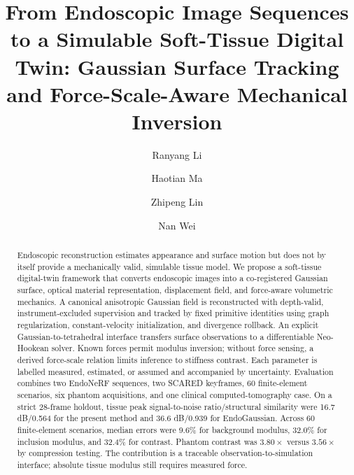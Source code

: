 \documentclass[smallextended]{svjour3}
\begin{document}
\title{From Endoscopic Image Sequences to a Simulable Soft-Tissue Digital Twin: Gaussian Surface Tracking and Force-Scale-Aware Mechanical Inversion}

\author{Ranyang Li \and Haotian Ma \and Zhipeng Lin \and Nan Wei}


\date{}
\maketitle

\begin{abstract}
Endoscopic reconstruction estimates
appearance and surface motion but does not by itself provide a mechanically
valid, simulable tissue model. We propose a soft-tissue digital-twin
framework that converts endoscopic images into a co-registered Gaussian
surface, optical material representation, displacement field, and
force-aware volumetric mechanics. A canonical anisotropic Gaussian field
is reconstructed with depth-valid, instrument-excluded supervision and
tracked by fixed primitive identities using graph regularization,
constant-velocity initialization, and divergence rollback. An explicit
Gaussian-to-tetrahedral interface transfers surface observations to a
differentiable Neo-Hookean solver. Known forces permit modulus inversion;
without force sensing, a derived force-scale relation limits inference to
stiffness contrast. Each parameter is labelled measured, estimated, or
assumed and accompanied by uncertainty. Evaluation combines two EndoNeRF
sequences, two SCARED keyframes, 60 finite-element scenarios, six phantom
acquisitions, and one clinical computed-tomography case. On a strict
28-frame holdout, tissue peak signal-to-noise ratio/structural similarity were 16.7 dB/0.564 for the present method and 36.6 dB/0.939 for EndoGaussian. Across 60 finite-element scenarios, median errors were 9.6\% for background modulus, 32.0\% for inclusion modulus, and 32.4\% for contrast. Phantom contrast was $3.80\times$ versus
$3.56\times$ by compression testing. The contribution is a traceable
observation-to-simulation interface; absolute tissue modulus still
requires measured force.
\end{abstract}
\end{document}
